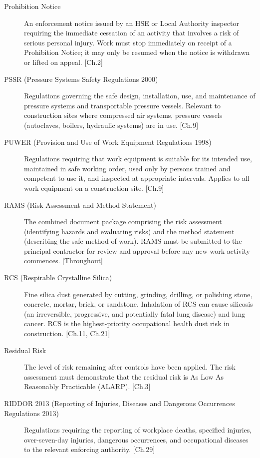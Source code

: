 \begin{description}
\item[Prohibition Notice] An enforcement notice issued by an HSE or Local Authority inspector requiring the immediate cessation of an activity that involves a risk of serious personal injury. Work must stop immediately on receipt of a Prohibition Notice; it may only be resumed when the notice is withdrawn or lifted on appeal. [Ch.2]

\item[PSSR (Pressure Systems Safety Regulations 2000)] Regulations governing the safe design, installation, use, and maintenance of pressure systems and transportable pressure vessels. Relevant to construction sites where compressed air systems, pressure vessels (autoclaves, boilers, hydraulic systems) are in use. [Ch.9]

\item[PUWER (Provision and Use of Work Equipment Regulations 1998)] Regulations requiring that work equipment is suitable for its intended use, maintained in safe working order, used only by persons trained and competent to use it, and inspected at appropriate intervals. Applies to all work equipment on a construction site. [Ch.9]

\item[RAMS (Risk Assessment and Method Statement)] The combined document package comprising the risk assessment (identifying hazards and evaluating risks) and the method statement (describing the safe method of work). RAMS must be submitted to the principal contractor for review and approval before any new work activity commences. [Throughout]

\item[RCS (Respirable Crystalline Silica)] Fine silica dust generated by cutting, grinding, drilling, or polishing stone, concrete, mortar, brick, or sandstone. Inhalation of RCS can cause silicosis (an irreversible, progressive, and potentially fatal lung disease) and lung cancer. RCS is the highest-priority occupational health dust risk in construction. [Ch.11, Ch.21]

\item[Residual Risk] The level of risk remaining after controls have been applied. The risk assessment must demonstrate that the residual risk is As Low As Reasonably Practicable (ALARP). [Ch.3]

\item[RIDDOR 2013 (Reporting of Injuries, Diseases and Dangerous Occurrences Regulations 2013)] Regulations requiring the reporting of workplace deaths, specified injuries, over-seven-day injuries, dangerous occurrences, and occupational diseases to the relevant enforcing authority. [Ch.29]


\end{description}
